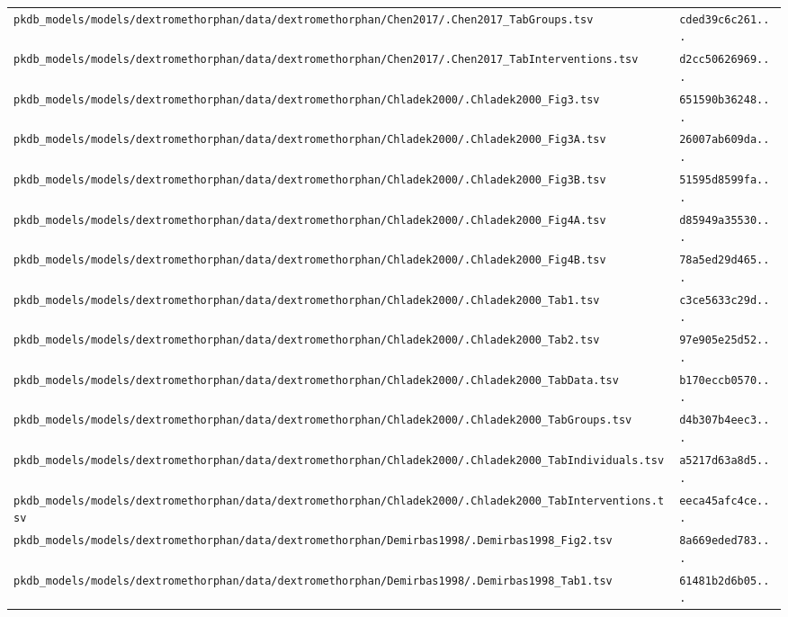 \begin{longtable}{ll}
\texttt{pkdb\_models/models/dextromethorphan/data/dextromethorphan/Chen2017/.Chen2017\_TabGroups.tsv} & \texttt{cded39c6c261...} \\
\texttt{pkdb\_models/models/dextromethorphan/data/dextromethorphan/Chen2017/.Chen2017\_TabInterventions.tsv} & \texttt{d2cc50626969...} \\
\texttt{pkdb\_models/models/dextromethorphan/data/dextromethorphan/Chladek2000/.Chladek2000\_Fig3.tsv} & \texttt{651590b36248...} \\
\texttt{pkdb\_models/models/dextromethorphan/data/dextromethorphan/Chladek2000/.Chladek2000\_Fig3A.tsv} & \texttt{26007ab609da...} \\
\texttt{pkdb\_models/models/dextromethorphan/data/dextromethorphan/Chladek2000/.Chladek2000\_Fig3B.tsv} & \texttt{51595d8599fa...} \\
\texttt{pkdb\_models/models/dextromethorphan/data/dextromethorphan/Chladek2000/.Chladek2000\_Fig4A.tsv} & \texttt{d85949a35530...} \\
\texttt{pkdb\_models/models/dextromethorphan/data/dextromethorphan/Chladek2000/.Chladek2000\_Fig4B.tsv} & \texttt{78a5ed29d465...} \\
\texttt{pkdb\_models/models/dextromethorphan/data/dextromethorphan/Chladek2000/.Chladek2000\_Tab1.tsv} & \texttt{c3ce5633c29d...} \\
\texttt{pkdb\_models/models/dextromethorphan/data/dextromethorphan/Chladek2000/.Chladek2000\_Tab2.tsv} & \texttt{97e905e25d52...} \\
\texttt{pkdb\_models/models/dextromethorphan/data/dextromethorphan/Chladek2000/.Chladek2000\_TabData.tsv} & \texttt{b170eccb0570...} \\
\texttt{pkdb\_models/models/dextromethorphan/data/dextromethorphan/Chladek2000/.Chladek2000\_TabGroups.tsv} & \texttt{d4b307b4eec3...} \\
\texttt{pkdb\_models/models/dextromethorphan/data/dextromethorphan/Chladek2000/.Chladek2000\_TabIndividuals.tsv} & \texttt{a5217d63a8d5...} \\
\texttt{pkdb\_models/models/dextromethorphan/data/dextromethorphan/Chladek2000/.Chladek2000\_TabInterventions.tsv} & \texttt{eeca45afc4ce...} \\
\texttt{pkdb\_models/models/dextromethorphan/data/dextromethorphan/Demirbas1998/.Demirbas1998\_Fig2.tsv} & \texttt{8a669eded783...} \\
\texttt{pkdb\_models/models/dextromethorphan/data/dextromethorphan/Demirbas1998/.Demirbas1998\_Tab1.tsv} & \texttt{61481b2d6b05...} \\

\end{longtable}
